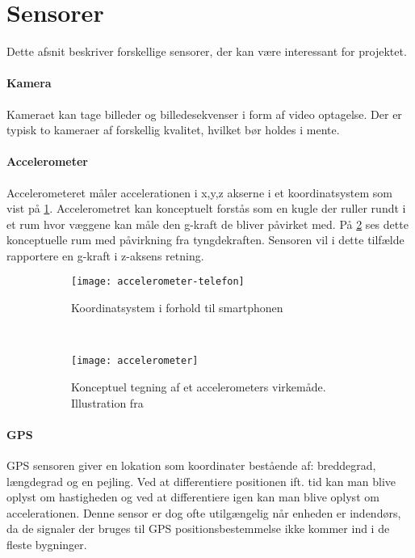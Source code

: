 \section{Sensorer}\label{sensorer}
Dette afsnit beskriver forskellige sensorer, der kan være interessant for projektet. 

\paragraph{Kamera}
Kameraet kan tage billeder og billedesekvenser i form af video optagelse.
Der er typisk to kameraer af forskellig kvalitet, hvilket bør holdes i mente.

\paragraph{Accelerometer}
Accelerometeret måler accelerationen i x,y,z akserne i et koordinatsystem som vist på \cref{analyse:accelerometer:koo}.
Accelerometret kan konceptuelt forstås som en kugle der ruller rundt i et rum hvor væggene kan måle den g-kraft de bliver påvirket med.
På \cref{analyse:accelerometer:kraft} ses dette konceptuelle rum med påvirkning fra tyngdekraften. 
Sensoren vil i dette tilfælde rapportere en g-kraft i z-aksens retning.

\begin{figure}[h]
	\centering
	\begin{subfigure}[b]{0.47\textwidth}
		\centering
		\texttt{[image: accelerometer-telefon]}
		\caption{Koordinatsystem i forhold til smartphonen}
		\label{analyse:accelerometer:koo}
	\end{subfigure}
	~
	\begin{subfigure}[b]{0.47\textwidth}
		\centering
		\texttt{[image: accelerometer]}
		\caption{Konceptuel tegning af et accelerometers virkemåde. Illustration fra \citep{accelerometer}}
		\label{analyse:accelerometer:kraft}
	\end{subfigure}
	\caption{}
	\label{accelerometer}
\end{figure} 

\paragraph{GPS}
GPS sensoren giver en lokation som koordinater bestående af: breddegrad, længdegrad og en pejling.
Ved at differentiere positionen ift. tid kan man blive oplyst om hastigheden og ved at differentiere igen kan man blive oplyst om accelerationen.
Denne sensor er dog ofte utilgængelig når enheden er indendørs, da de signaler der bruges til GPS positionsbestemmelse ikke kommer ind i de fleste bygninger.

